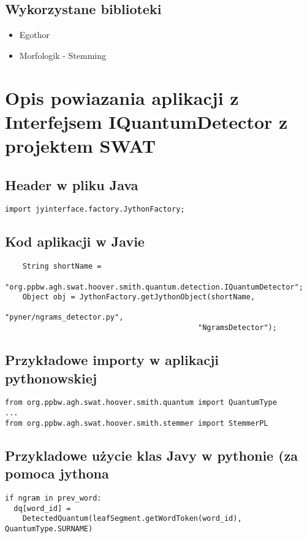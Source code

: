 \documentclass[12pt]{article}
\begin{document}
\subsection{Wykorzystane biblioteki}
\begin{itemize}
\item Egothor
\item Morfologik - Stemming
\end{itemize}


\section{Opis powiazania aplikacji z Interfejsem IQuantumDetector z projektem SWAT}
\subsection{Header w pliku Java}
\begin{verbatim}
import jyinterface.factory.JythonFactory;
\end{verbatim}
\subsection{Kod aplikacji w Javie}
\begin{verbatim}
	String shortName = 
    "org.ppbw.agh.swat.hoover.smith.quantum.detection.IQuantumDetector";
	Object obj = JythonFactory.getJythonObject(shortName, 
                                            "pyner/ngrams_detector.py", 
                                            "NgramsDetector");
\end{verbatim}
\subsection{Przykładowe importy w aplikacji pythonowskiej}
\begin{verbatim}
from org.ppbw.agh.swat.hoover.smith.quantum import QuantumType
...
from org.ppbw.agh.swat.hoover.smith.stemmer import StemmerPL
\end{verbatim}

\subsection{Przykladowe użycie klas Javy w pythonie (za pomoca jythona}
\begin{verbatim}
if ngram in prev_word:
  dq[word_id] = 
    DetectedQuantum(leafSegment.getWordToken(word_id), QuantumType.SURNAME)
\end{verbatim}
\end{document}
